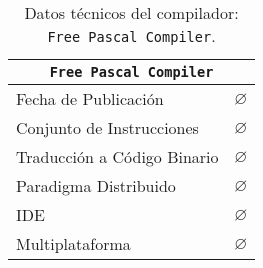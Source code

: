 \begin{table}[h]

\begin{center}

\begin{tabular}{|l|l|}\hline
\multicolumn{2}{|c|}{\texttt{Free Pascal Compiler}}\\ 
\hline
\hline
Fecha de Publicación & $\varnothing$ \\ \hline
Conjunto de Instrucciones &  $\varnothing$ \\ \hline
Traducción a Código Binario & $\varnothing$ \\ \hline
Paradigma Distribuido & $\varnothing$ \\ \hline
IDE &  $\varnothing$ \\ \hline
Multiplataforma & $\varnothing$ \\ \hline
\end{tabular}

\caption{Datos técnicos del compilador: \texttt{Free Pascal Compiler}.}

\end{center}

\end{table}